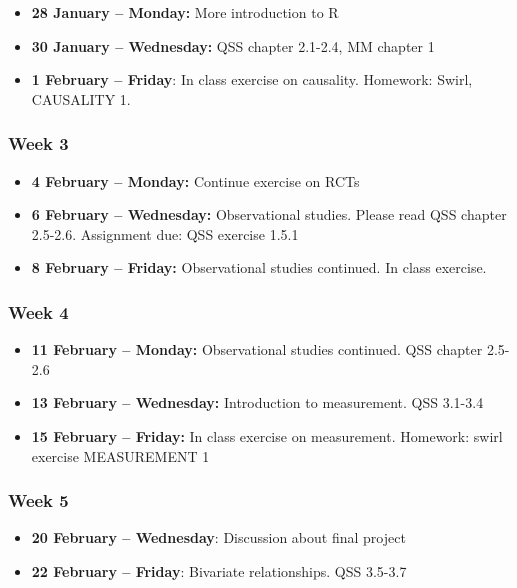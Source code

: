 \documentclass[a4paper,12pt]{article}
\begin{document}
\begin{itemize}
	\item \textbf{28 January -- Monday:} More introduction to R
	\item \textbf{30 January -- Wednesday:}  QSS chapter 2.1-2.4, MM chapter 1
	\item \textbf{1 February -- Friday}: In class exercise on causality. Homework: Swirl, CAUSALITY 1. 
\end{itemize}

\subsubsection*{Week 3} 

\begin{itemize}
	\item \textbf{4 February -- Monday:} Continue exercise on RCTs
	\item \textbf{6 February -- Wednesday:} Observational studies. Please read QSS chapter 2.5-2.6. Assignment due: QSS exercise 1.5.1 
	\item \textbf{8 February -- Friday:} Observational studies continued. In class exercise.
\end{itemize}

\subsubsection*{Week 4}

\begin{itemize}
	\item \textbf{11 February -- Monday:} Observational studies continued. QSS chapter 2.5-2.6 
	\item \textbf{13 February -- Wednesday:} Introduction to measurement. QSS 3.1-3.4 
	\item \textbf{15 February -- Friday:} In class exercise on measurement. Homework: swirl exercise MEASUREMENT 1 
\end{itemize}

\subsubsection*{Week 5}

\begin{itemize}
	\item \textbf{20 February -- Wednesday}: Discussion about final project
	\item \textbf{22 February -- Friday}: Bivariate relationships. QSS 3.5-3.7 
\end{itemize}
\end{document}
